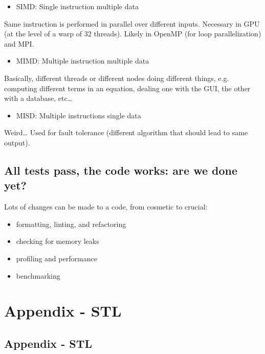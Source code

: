 \begin{itemize}
\itemsep1pt\parskip0pt
\item
  SIMD: Single instruction multiple data
\end{itemize}

Same instruction is performed in parallel over different inputs.
Necessary in GPU (at the level of a warp of 32 threads). Likely in
OpenMP (for loop parallelization) and MPI.

\begin{itemize}
\itemsep1pt\parskip0pt
\item
  MIMD: Multiple instruction multiple data
\end{itemize}

Basically, different threads or different nodes doing different things,
e.g. computing different terms in an equation, dealing one with the GUI,
the other with a database, etc\ldots{}

\begin{itemize}
\itemsep1pt\parskip0pt
\item
  MISD: Multiple instructions single data
\end{itemize}

Weird\ldots{} Used for fault tolerance (different algorithm that should
lead to same output).

\subsection{All tests pass, the code works: are we done
yet?}\label{all-tests-pass-the-code-works-are-we-done-yet}

Lots of changes can be made to a code, from cosmetic to crucial:

\begin{itemize}
\itemsep1pt\parskip0pt
\item
  formatting, linting, and refactoring
\item
  checking for memory leaks
\item
  profiling and performance
\item
  benchmarking
\end{itemize}

\section{Appendix - STL}\label{appendix---stl}

\subsection{Appendix - STL}\label{appendix---stl-1}

